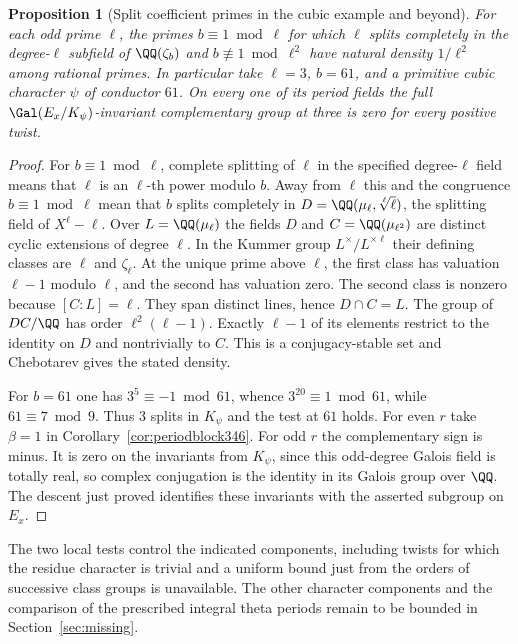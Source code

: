 \documentclass[a4paper,11pt]{article}
\newtheorem{proposition}{Proposition}[section]
\theoremstyle{definition}
\theoremstyle{remark}
\numberwithin{equation}{section}
\begin{document}
\begin{proposition}[Split coefficient primes in the cubic example and beyond]\leavevmode\label{prop:splitexample346}
For each odd prime $\ell$, the primes $b\equiv1\bmod\ell$ for
which $\ell$ splits completely in the degree-$\ell$ subfield
of $\QQ(\zeta_b)$ and $b\not\equiv1\bmod\ell^2$ have natural
density $1/\ell^2$ among rational primes. In particular take
$\ell=3$, $b=61$, and a primitive cubic character $\psi$ of
conductor $61$. On every one of its period fields the full
$\Gal(E_x/K_\psi)$-invariant complementary group at three is
zero for every positive twist.
\end{proposition}
\begin{proof}
For $b\equiv1\bmod\ell$, complete splitting of $\ell$ in the
specified degree-$\ell$ field means that $\ell$ is an
$\ell$-th power modulo $b$. Away from $\ell$ this and the
congruence $b\equiv1\bmod\ell$ mean that $b$ splits completely
in $D=\QQ(\mu_\ell,\sqrt[\ell]{\ell})$, the splitting field of
$X^\ell-\ell$. Over $L=\QQ(\mu_\ell)$ the fields $D$ and
$C=\QQ(\mu_{\ell^2})$ are distinct cyclic extensions of
degree $\ell$. In the Kummer group $L^\times/L^{\times\ell}$
their defining classes are $\ell$ and $\zeta_\ell$. At the
unique prime above $\ell$, the first class has valuation
$\ell-1$ modulo $\ell$, and the second has valuation zero.
The second class is nonzero because $[C:L]=\ell$. They span
distinct lines, hence $D\cap C=L$. The group of $DC/\QQ$
has order $\ell^2(\ell-1)$. Exactly $\ell-1$ of its
elements restrict to the identity on $D$ and nontrivially to
$C$. This is a conjugacy-stable set and Chebotarev gives the
stated density. \cite[Chapter VI]{V-III-V-cft101}

For $b=61$ one has $3^5\equiv-1\bmod61$, whence
$3^{20}\equiv1\bmod61$, while $61\equiv7\bmod9$.
Thus $3$ splits in $K_\psi$ and the test at $61$ holds.
For even $r$ take $\beta=1$ in Corollary~\ref{cor:periodblock346}.
For odd $r$ the complementary sign is minus. It is zero on
the invariants from $K_\psi$, since this odd-degree Galois field
is totally real, so complex conjugation is the identity in its
Galois group over $\QQ$. The descent just proved identifies
these invariants with the asserted subgroup on $E_x$.
\end{proof}

The two local tests control the indicated components, including
twists for which the residue character is trivial and a uniform
bound just from the orders of successive class groups is
unavailable. The other character components and the comparison
of the prescribed integral theta periods remain to be bounded
in Section~\ref{sec:missing}.
\end{document}
